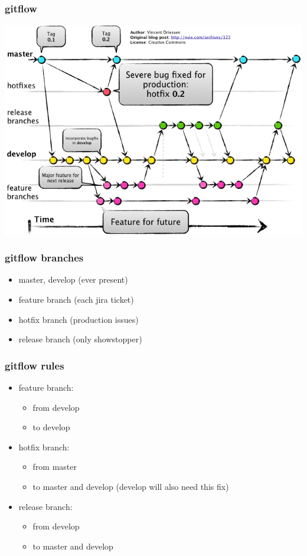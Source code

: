 \begin{frame}
	\frametitle{gitflow}
	\includegraphics[width=\textwidth]{images/gitflow.png}
\end{frame}

\begin{frame}
	\frametitle{gitflow branches}
	\begin{block}{}
	\begin{itemize}
		\item master, develop (ever present)

		\item feature branch (each jira ticket)
		\item hotfix branch (production issues)
		\item release branch (only showstopper)
	\end{itemize}
	\end{block}
\end{frame}

\begin{frame}
	\frametitle{gitflow rules}
	\begin{block}{}
	\begin{itemize}
		\item feature branch:
		\begin{itemize}
			\item from develop
			\item to develop
		\end{itemize}

		\item hotfix branch:
		\begin{itemize}
			\item from master
			\item to master and develop (develop will also need this fix)
		\end{itemize}

		\item release branch:
		\begin{itemize}
			\item from develop
			\item to master and develop
		\end{itemize}
	\end{itemize}
	\end{block}
\end{frame}

